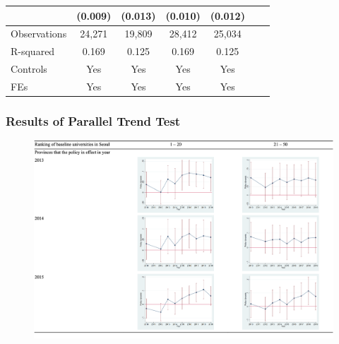 \documentclass[aspectratio=169,xcolor=dvipsnames,handout]{beamer}
\begin{document}
\begin{frame}
\begin{table}[ht]
\begin{tabular}{lcccccc}
                                                     & (0.009)   & (0.013)   & (0.010)   & (0.012)   \\
        \midrule                                                          
        Observations                                 & 24,271    & 19,809    & 28,412    & 25,034    \\
        R-squared                                    & 0.169     & 0.125     & 0.169     & 0.125     \\
        Controls                                     & Yes       & Yes       & Yes       & Yes       \\
        FEs                                          & Yes       & Yes       & Yes       & Yes       \\
        \bottomrule
        \end{tabular}
    \end{table}
\end{frame}

\begin{frame}
    \frametitle{Results of Parallel Trend Test}
    \centering
    \begin{figure}
        \includegraphics[width=.7\textwidth]{pic/pttest.png}
    \end{figure}
\end{frame}
\end{document}
